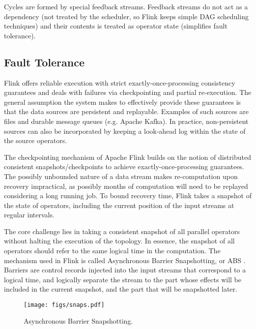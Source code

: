 Cycles are formed by special feedback streams. Feedback streams do not act as a dependency (not treated by the scheduler, so Flink keeps simple DAG scheduling techniques) and their contents is treated as operator state (simplifies fault tolerance). 

\subsection{Fault Tolerance}

\label{sec:fault-tolerance}
Flink offers reliable execution with strict exactly-once-processing consistency guarantees and deals with failures via checkpointing and partial re-execution. The general assumption the system makes to effectively provide these guarantees is that the data sources are persistent and replayable. Examples of such sources are files and durable message queues (e.g. Apache Kafka). In practice, non-persistent sources can also be incorporated by keeping a look-ahead log within the state of the source operators.

The checkpointing mechanism of Apache Flink builds on the notion of distributed consistent snapshots/checkpoints to achieve exactly-once-processing guarantees. The possibly unbounded nature of a data stream makes re-computation upon recovery impractical, as possibly months of computation will need to be replayed considering a long running job. To bound recovery time, Flink takes a snapshot of the state of operators, including the current position of the input streams at regular intervals.

The core challenge lies in taking a consistent snapshot of all parallel operators without halting the execution of the topology. In essence, the snapshot of all operators should refer to the same logical time in the computation. The mechanism used in Flink is called Asynchronous Barrier Snapshotting, or ABS \cite{carbone2015lightweight}. Barriers are control records injected into the input streams that correspond to a logical time, and logically separate the stream to the part whose effects will be included in the current snapshot, and the part that will be snapshotted later.

\begin{figure}[t!]
	\centering
  	\texttt{[image: figs/snaps.pdf]}
  	\vspace{-6mm}
	\caption{Asynchronous Barrier Snapshotting.}
	\vspace{-2mm}
	\label{fig:snapshots}
\end{figure}

